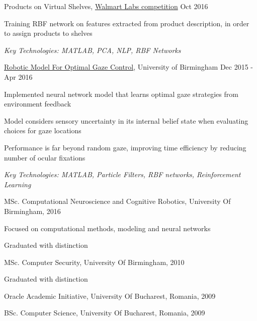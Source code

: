 \documentclass[11pt,article,oneside]{memoir}
\newenvironment{itemize*}{%
  \renewcommand\labelitemi{\textbullet}
  \footnotesize
  \begin{itemize}%
    \setlength{\itemsep}{0pt}}%
  {\end{itemize}
}
\begin{document}
\normalsize
\medskip
\ind Products on Virtual Shelves, \href{https://www.hackerrank.com/walmart-codesprint-ml}{Walmart Labs competition} \hfill Oct 2016
\begin{itemize*}
  \item Training RBF network on features extracted from product description, in order to assign products to shelves
\end{itemize*}
\ind \hspace{0.35in} \footnotesize \emph{Key Technologies: MATLAB, PCA, NLP, RBF Networks}

\normalsize
\medskip
\ind \href{https://github.com/iceiony/gaze-control/}{Robotic Model For Optimal Gaze Control}, University of Birmingham \hfill Dec 2015 - Apr 2016
\begin{itemize*}
  \item Implemented neural network model that learns optimal gaze strategies from environment feedback
  \item Model considers sensory uncertainty in its internal belief state when evaluating choices for gaze locations
  \item Performance is far beyond random gaze, improving time efficiency by reducing number of ocular fixations 
\end{itemize*}
\ind \hspace{0.35in} \footnotesize \emph{Key Technologies: MATLAB, Particle Filters, RBF networks, Reinforcement Learning}


\normalsize
\bigskip
{}

\ind MSc. Computational Neuroscience and Cognitive Robotics, University Of Birmingham, \hfill 2016

\ind \hspace{0.35in} \footnotesize Focused on computational methods, modeling and neural networks \normalsize

\ind \hspace{0.35in} \footnotesize Graduated with distinction \normalsize

\ind MSc. Computer Security, University Of Birmingham, \hfill 2010

\ind \hspace{0.35in} \footnotesize Graduated with distinction \normalsize

\ind Oracle Academic Initiative, University Of Bucharest, Romania, \hfill 2009

\ind BSc. Computer Science, University Of Bucharest, Romania, \hfill 2009
\end{document}
